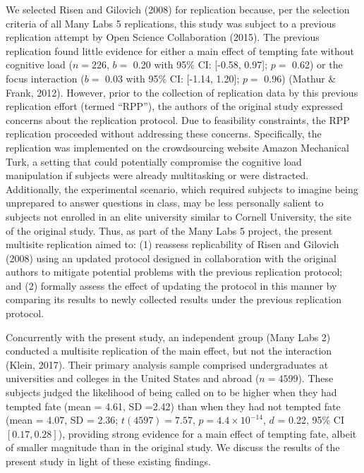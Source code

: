 \documentclass[english,floatsintext,man]{apa6}
\newcounter{author}
\theoremstyle{definition}
\theoremstyle{definition}
\theoremstyle{definition}
\theoremstyle{remark}
\begin{document}
We selected Risen and Gilovich (2008) for replication because, per the
selection criteria of all Many Labs 5 replications, this study was
subject to a previous replication attempt by Open Science Collaboration
(2015). The previous replication found little evidence for either a main
effect of tempting fate without cognitive load (\(n=226\), \(b=\) 0.20
with 95\% CI: {[}-0.58, 0.97{]}; \(p=\) 0.62) or the focus interaction
(\(b=\) 0.03 with 95\% CI: {[}-1.14, 1.20{]}; \(p=\) 0.96) (Mathur \&
Frank, 2012). However, prior to the collection of replication data by
this previous replication effort (termed \enquote{RPP}), the authors of
the original study expressed concerns about the replication protocol.
Due to feasibility constraints, the RPP replication proceeded without
addressing these concerns. Specifically, the replication was implemented
on the crowdsourcing website Amazon Mechanical Turk, a setting that
could potentially compromise the cognitive load manipulation if subjects
were already multitasking or were distracted. Additionally, the
experimental scenario, which required subjects to imagine being
unprepared to answer questions in class, may be less personally salient
to subjects not enrolled in an elite university similar to Cornell
University, the site of the original study. Thus, as part of the Many
Labs 5 project, the present multisite replication aimed to: (1) reassess
replicability of Risen and Gilovich (2008) using an updated protocol
designed in collaboration with the original authors to mitigate
potential problems with the previous replication protocol; and (2)
formally assess the effect of updating the protocol in this manner by
comparing its results to newly collected results under the previous
replication protocol.

Concurrently with the present study, an independent group (Many Labs 2)
conducted a multisite replication of the main effect, but not the
interaction (Klein, 2017). Their primary analysis sample comprised
undergraduates at universities and colleges in the United States and
abroad (\(n=4599\)). These subjects judged the likelihood of being
called on to be higher when they had tempted fate (mean = 4.61, SD
=2.42) than when they had not tempted fate (mean = 4.07, SD = 2.36;
\(t(4597) =7.57\), \(p = 4.4 \times 10^{-14}\), \(d\) = 0.22, 95\% CI
\([0.17, 0.28]\)), providing strong evidence for a main effect of
tempting fate, albeit of smaller magnitude than in the original study.
We discuss the results of the present study in light of these existing
findings.
\end{document}
